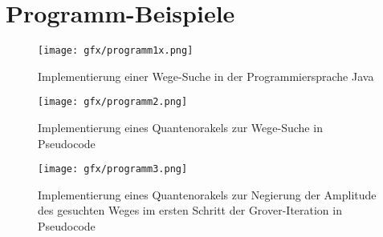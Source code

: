 \chapter{Programm-Beispiele}
\label{ch:programmbeispiele}
\begin{figure}[h]
	\centering
	\texttt{[image: gfx/programm1x.png]}
	\caption{Implementierung einer Wege-Suche in der Programmiersprache Java}
	\label{fig:programmbeispiele:grafik1}
\end{figure}

\begin{figure}[h]
\centering
\texttt{[image: gfx/programm2.png]}
\caption{Implementierung eines Quantenorakels zur Wege-Suche in Pseudocode}
\label{fig:programmbeispiele:grafik2}
\end{figure}

\begin{figure}[h]
\centering
\texttt{[image: gfx/programm3.png]}
\caption{Implementierung eines Quantenorakels zur Negierung der Amplitude des gesuchten Weges im ersten Schritt der Grover-Iteration in Pseudocode}
\label{fig:programmbeispiele:grafik3}
\end{figure}